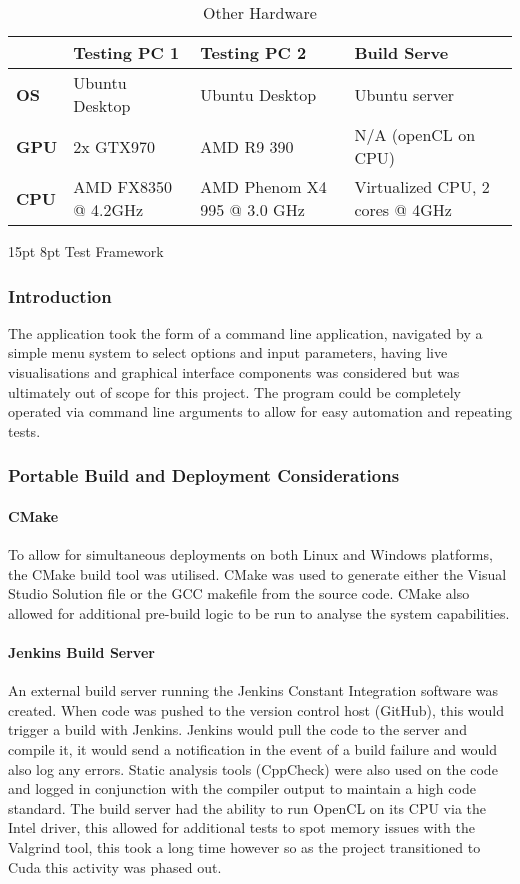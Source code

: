 \documentclass[12pt,a4paper]{article}
\makeatletter
\renewcommand\subsection{\@startsection {subsection}{1}{2mm} %
                               {15pt} %
                               {8pt} %
                               {\fontsize{13pt}{1em}\bfseries}}
\makeatother
\begin{document}
\begin{table*}[h]\centering
	\begin{tabular}{p{0.8cm}p{4.5cm}p{4.7cm}p{4.8cm}}\toprule
		& Testing PC 1 & Testing PC 2 & Build Serve \\ \midrule
		\textbf{OS} & Ubuntu Desktop & Ubuntu Desktop & Ubuntu server\\
		\textbf{GPU} & 2x GTX970 & AMD R9 390 & N/A (openCL on CPU)\\
		\textbf{CPU} & AMD FX8350 @ 4.2GHz &AMD Phenom X4 995 @ 3.0 GHz & Virtualized CPU, 2 cores @ 4GHz \\
		\bottomrule
	\end{tabular}
	\caption{Other Hardware}
\end{table*}

\subsection{Test Framework}
\subsubsection{Introduction}
The application took the form of a command line application, navigated by a simple menu system to select options and input parameters, having live visualisations and graphical interface components was considered but was ultimately out of scope for this project.
The program could be completely operated via command line arguments to allow for easy automation and repeating tests.

\subsubsection{Portable Build and Deployment Considerations}

\paragraph{CMake}
To allow for simultaneous deployments on both Linux and Windows platforms, the CMake build tool was utilised. CMake was used to generate either the Visual Studio Solution file or the GCC makefile from the source code. CMake also allowed for additional pre-build logic to be run to analyse the system capabilities.
 
\paragraph{Jenkins Build Server}
An external build server running the Jenkins Constant Integration software was created. When code was pushed to the version control host (GitHub), this would trigger a build with Jenkins. Jenkins would pull the code to the server and compile it, it would send a notification in the event of a build failure and would also log any errors. Static analysis tools (CppCheck) were also used on the code and logged in conjunction with the compiler output to maintain a high code standard. The build server had the ability to run OpenCL on its CPU via the Intel driver, this allowed for additional tests to spot memory issues with the Valgrind tool, this took a long time however so as the project transitioned to Cuda this activity was phased out.
\end{document}
